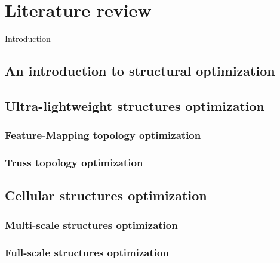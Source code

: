 \setchapterpreamble[u]{\margintoc}
\glsresetall %

\chapter{Literature review}
Introduction
\section{An introduction to structural optimization}

\section{Ultra-lightweight structures optimization}

\subsection{Feature-Mapping topology optimization}

\subsection{Truss topology optimization}

\section{Cellular structures optimization}

\subsection{Multi-scale structures optimization}

\subsection{Full-scale structures optimization}